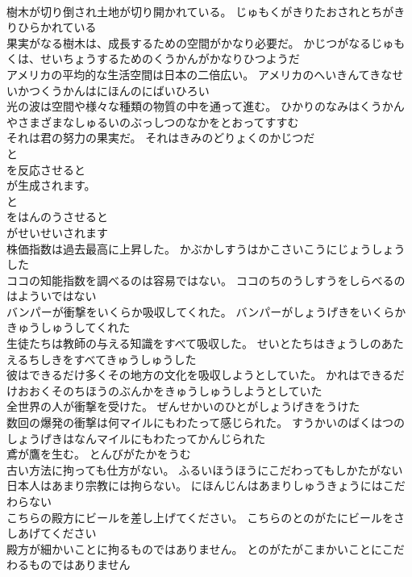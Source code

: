 \documentclass[8pt]{extreport}
\begin{document}
\begin{CJK}{UTF8}{min}
\\	樹木が切り倒され土地が切り開かれている。	じゅもくがきりたおされとちがきりひらかれている 
\\	果実がなる樹木は、成長するための空間がかなり必要だ。	かじつがなるじゅもくは、せいちょうするためのくうかんがかなりひつようだ 
\\	アメリカの平均的な生活空間は日本の二倍広い。	アメリカのへいきんてきなせいかつくうかんはにほんのにばいひろい 
\\	光の波は空間や様々な種類の物質の中を通って進む。	ひかりのなみはくうかんやさまざまなしゅるいのぶっしつのなかをとおってすすむ 
\\	それは君の努力の果実だ。	それはきみのどりょくのかじつだ 
\\	と
\\	を反応させると
\\	が生成されます。	
\\	と
\\	をはんのうさせると
\\	がせいせいされます 
\\	株価指数は過去最高に上昇した。	かぶかしすうはかこさいこうにじょうしょうした 
\\	ココの知能指数を調べるのは容易ではない。	ココのちのうしすうをしらべるのはよういではない 
\\	バンパーが衝撃をいくらか吸収してくれた。	バンパーがしょうげきをいくらかきゅうしゅうしてくれた 
\\	生徒たちは教師の与える知識をすべて吸収した。	せいとたちはきょうしのあたえるちしきをすべてきゅうしゅうした 
\\	彼はできるだけ多くその地方の文化を吸収しようとしていた。	かれはできるだけおおくそのちほうのぶんかをきゅうしゅうしようとしていた 
\\	全世界の人が衝撃を受けた。	ぜんせかいのひとがしょうげきをうけた 
\\	数回の爆発の衝撃は何マイルにもわたって感じられた。	すうかいのばくはつのしょうげきはなんマイルにもわたってかんじられた 
\\	鳶が鷹を生む。	とんびがたかをうむ 
\\	古い方法に拘っても仕方がない。	ふるいほうほうにこだわってもしかたがない 
\\	日本人はあまり宗教には拘らない。	にほんじんはあまりしゅうきょうにはこだわらない 
\\	こちらの殿方にビールを差し上げてください。	こちらのとのがたにビールをさしあげてください 
\\	殿方が細かいことに拘るものではありません。	とのがたがこまかいことにこだわるものではありません 

\end{CJK}
\end{document}
